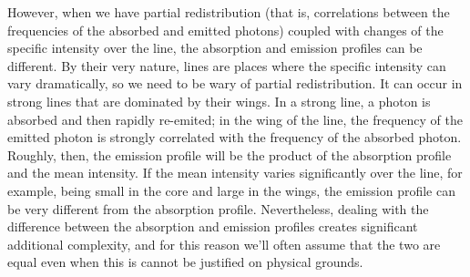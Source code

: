However, when we have partial redistribution (that is,
correlations between the frequencies of the absorbed and
emitted photons) coupled with changes of the specific
intensity over the line, the absorption and emission
profiles can be different. By their very nature, lines are
places where the specific intensity can vary dramatically,
so we need to be wary of partial redistribution. It can
occur in strong lines that are dominated by their wings. In
a strong line, a photon is absorbed and then rapidly
re-emited; in the wing of the line, the frequency of the
emitted photon is strongly correlated with the frequency of
the absorbed photon. Roughly, then, the emission profile
will be the product of the absorption profile and the mean
intensity. If the mean intensity varies significantly over
the line, for example, being small in the core and large in
the wings, the emission profile can be very different from
the absorption profile. Nevertheless, dealing with the
difference between the absorption and emission profiles
creates significant additional complexity, and for this
reason we'll often assume that the two are equal even when
this is cannot be justified on physical grounds.

